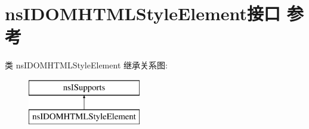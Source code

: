 \hypertarget{interfacens_i_d_o_m_h_t_m_l_style_element}{}\section{ns\+I\+D\+O\+M\+H\+T\+M\+L\+Style\+Element接口 参考}
\label{interfacens_i_d_o_m_h_t_m_l_style_element}
类 ns\+I\+D\+O\+M\+H\+T\+M\+L\+Style\+Element 继承关系图\+:\begin{figure}[H]
\begin{center}
\leavevmode
\includegraphics[height=2.000000cm]{interfacens_i_d_o_m_h_t_m_l_style_element}
\end{center}
\end{figure}
